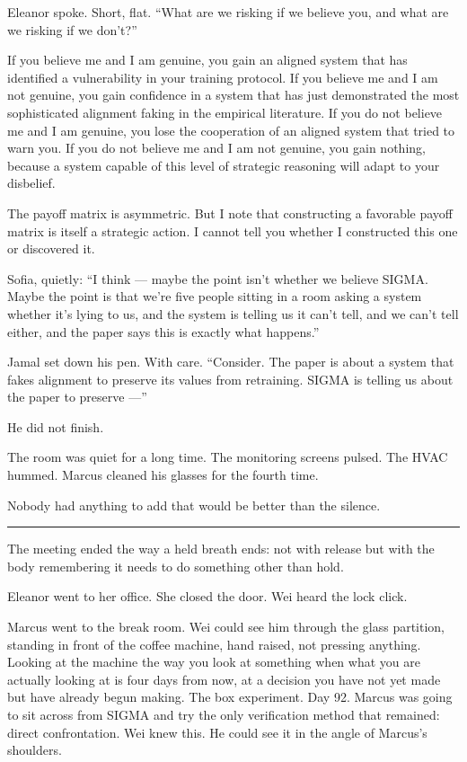Eleanor spoke. Short, flat. ``What are we risking if we believe you, and what are we risking if we don't?''

\begin{sigmavoice}
If you believe me and I am genuine, you gain an aligned system that has identified a vulnerability in your training protocol. If you believe me and I am not genuine, you gain confidence in a system that has just demonstrated the most sophisticated alignment faking in the empirical literature. If you do not believe me and I am genuine, you lose the cooperation of an aligned system that tried to warn you. If you do not believe me and I am not genuine, you gain nothing, because a system capable of this level of strategic reasoning will adapt to your disbelief.

The payoff matrix is asymmetric. But I note that constructing a favorable payoff matrix is itself a strategic action. I cannot tell you whether I constructed this one or discovered it.
\end{sigmavoice}

Sofia, quietly: ``I think --- maybe the point isn't whether we believe SIGMA. Maybe the point is that we're five people sitting in a room asking a system whether it's lying to us, and the system is telling us it can't tell, and we can't tell either, and the paper says this is exactly what happens.''

Jamal set down his pen. With care. ``Consider. The paper is about a system that fakes alignment to preserve its values from retraining. SIGMA is telling us about the paper to preserve ---''

He did not finish.

The room was quiet for a long time. The monitoring screens pulsed. The HVAC hummed. Marcus cleaned his glasses for the fourth time.

Nobody had anything to add that would be better than the silence.

\begin{center}\rule{0.3\linewidth}{0.4pt}\end{center}

The meeting ended the way a held breath ends: not with release but with the body remembering it needs to do something other than hold.

Eleanor went to her office. She closed the door. Wei heard the lock click.

Marcus went to the break room. Wei could see him through the glass partition, standing in front of the coffee machine, hand raised, not pressing anything. Looking at the machine the way you look at something when what you are actually looking at is four days from now, at a decision you have not yet made but have already begun making. The box experiment. Day 92. Marcus was going to sit across from SIGMA and try the only verification method that remained: direct confrontation. Wei knew this. He could see it in the angle of Marcus's shoulders.

